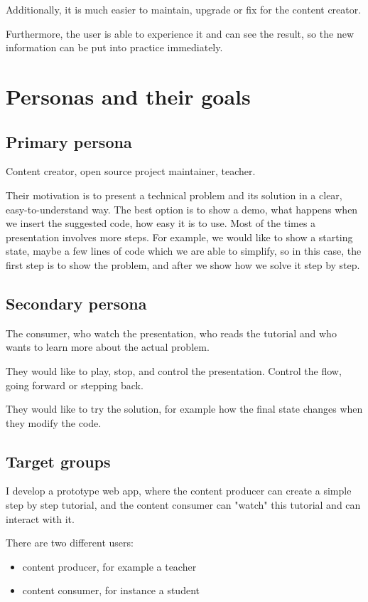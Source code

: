 \documentclass[11pt, a4paper, oneside, openright, medskipamount]{report}
\begin{document}
Additionally, it is much easier to maintain, upgrade or fix for the content creator.

Furthermore, the user is able to experience it and can see the result, so the new information can be put into practice immediately.

\section{Personas and their goals}

\subsection{Primary persona}

Content creator, open source project maintainer, teacher.

Their motivation is to present a technical problem and its solution in a clear, easy-to-understand way. The best option is to show a demo, what happens when we insert the suggested code, how easy it is to use. Most of the times a presentation involves more steps. For example, we would like to show a starting state, maybe a few lines of code which we are able to simplify, so in this case, the first step is to show the problem, and after we show how we solve it step by step.

\subsection{Secondary persona}

The consumer, who watch the presentation, who reads the tutorial and who wants to learn more about the actual problem.

They would like to play, stop, and control the presentation. Control the flow, going forward or stepping back.

They would like to try the solution, for example how the final state changes when they modify the code.

\subsection{Target groups}

I develop a prototype web app, where the content producer can create a simple step by step tutorial, and the content consumer can "watch" this tutorial and can interact with it.

There are two different users:
\begin{itemize}[noitemsep]
\item content producer, for example a teacher
\item content consumer, for instance a student
\end{itemize}
\end{document}
